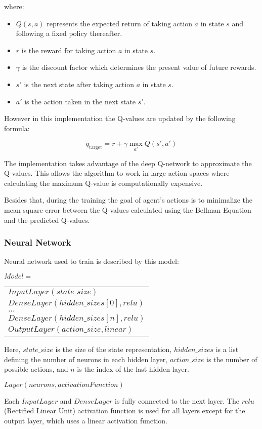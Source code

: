 where:
\begin{itemize}
    \item $Q(s, a)$ represents the expected return of taking action $a$ in state $s$ and following a fixed policy thereafter.
    \item $r$ is the reward for taking action $a$ in state $s$.
    \item $\gamma$ is the discount factor which determines the present value of future rewards.
    \item $s'$ is the next state after taking action $a$ in state $s$.
    \item $a'$ is the action taken in the next state $s'$.
\end{itemize}

However in this implementation the Q-values are updated by the following formula:

\[
q_{\text{target}} = r + \gamma \max_{a'} Q(s', a')
\]

The implementation takes advantage of the deep Q-network to approximate the Q-values. This allows the algorithm to work in large action spaces where calculating the maximum Q-value is computationally expensive.

Besides that, during the training the goal of agent's actions is to minimalize the mean square error between the Q-values calculated using the Bellman Equation and the predicted Q-values.

\subsubsection{Neural Network}
Neural network used to train is described by this model:

\begin{center}
    $Model = $
    \begin{tabular}{l}
    $InputLayer(state\_size)$\\
    $DenseLayer(hidden\_sizes[0], relu)$\\
    $...$\\
    $DenseLayer(hidden\_sizes[n], relu)$\\
    $OutputLayer(action\_size, linear)$
    \end{tabular}
\end{center}

Here, $state\_size$ is the size of the state representation, $hidden\_sizes$ is a list defining the number of neurons in each hidden layer, $action\_size$ is the number of possible actions, and $n$ is the index of the last hidden layer. 

\begin{center}
    $Layer(neurons, activationFunction)$\\
\end{center}

Each $InputLayer$ and $DenseLayer$ is fully connected to the next layer. The $relu$ (Rectified Linear Unit) activation function is used for all layers except for the output layer, which uses a linear activation function.